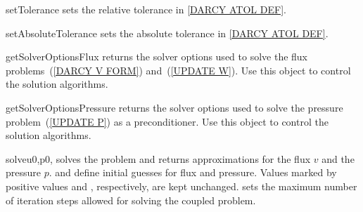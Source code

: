 \begin{methoddesc}[DarcyFlow]{setTolerance}{}
sets the relative tolerance  in \ref{DARCY ATOL DEF}.
\end{methoddesc}

\begin{methoddesc}[DarcyFlow]{setAbsoluteTolerance}{}
sets the absolute tolerance  in \ref{DARCY ATOL DEF}.
\end{methoddesc}

\begin{methoddesc}[DarcyFlow]{getSolverOptionsFlux}{}
returns the solver options used to solve the flux problems~(\ref{DARCY V FORM}) and~(\ref{UPDATE W}).
Use this \SolverOptions object to control the solution algorithms.
\end{methoddesc}

\begin{methoddesc}[DarcyFlow]{getSolverOptionsPressure}{}
returns the solver options used to solve the pressure problem~(\ref{UPDATE P})
as a preconditioner.
Use this \SolverOptions object to control the solution algorithms.
\end{methoddesc}

\begin{methoddesc}[DarcyFlow]{solve}{u0,p0, }
solves the problem and returns approximations for the flux $v$ and the pressure $p$.
 and  define initial guesses for flux and pressure.
Values marked by positive values  and
, respectively, are kept unchanged.
 sets the maximum number of iteration steps allowed for solving
the coupled problem.
\end{methoddesc}


